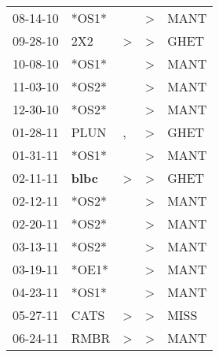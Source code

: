 \begin{supertabular}{p{0.07\textwidth}p{0.06\textwidth}p{0.02\textwidth}p{0.02\textwidth}p{0.06\textwidth}}
          08-14-10\textsuperscript{} &                            *OS1* &                  &  \textgreater &           MANT\textsuperscript{} \\
          09-28-10\textsuperscript{} &            2X2\textsuperscript{} &     \textgreater &  \textgreater &           GHET\textsuperscript{} \\
          10-08-10\textsuperscript{} &                            *OS1* &                  &  \textgreater &           MANT\textsuperscript{} \\
          11-03-10\textsuperscript{} &                            *OS2* &                  &  \textgreater &           MANT\textsuperscript{} \\
          12-30-10\textsuperscript{} &                            *OS2* &                  &  \textgreater &           MANT\textsuperscript{} \\
          01-28-11\textsuperscript{} &           PLUN\textsuperscript{} &                , &  \textgreater &           GHET\textsuperscript{} \\
          01-31-11\textsuperscript{} &                            *OS1* &                  &  \textgreater &           MANT\textsuperscript{} \\
          02-11-11\textsuperscript{} &  \textbf{blbc\textsuperscript{}} &     \textgreater &  \textgreater &           GHET\textsuperscript{} \\
          02-12-11\textsuperscript{} &                            *OS2* &                  &  \textgreater &           MANT\textsuperscript{} \\
          02-20-11\textsuperscript{} &                            *OS2* &                  &  \textgreater &           MANT\textsuperscript{} \\
          03-13-11\textsuperscript{} &                            *OS2* &                  &  \textgreater &           MANT\textsuperscript{} \\
          03-19-11\textsuperscript{} &                            *OE1* &                  &  \textgreater &           MANT\textsuperscript{} \\
          04-23-11\textsuperscript{} &                            *OS1* &                  &  \textgreater &           MANT\textsuperscript{} \\
          05-27-11\textsuperscript{} &           CATS\textsuperscript{} &     \textgreater &  \textgreater &           MISS\textsuperscript{} \\
          06-24-11\textsuperscript{} &           RMBR\textsuperscript{} &     \textgreater &  \textgreater &           MANT\textsuperscript{} \\

\end{supertabular}
